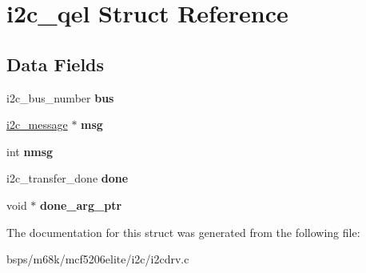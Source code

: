 \hypertarget{structi2c__qel}{}\section{i2c\+\_\+qel Struct Reference}
\label{structi2c__qel}
\subsection*{Data Fields}
\begin{DoxyCompactItemize}
\item 
\mbox{\label{structi2c__qel_a3d07d193200cafd5cd8cd2ca87120223}} 
i2c\+\_\+bus\+\_\+number {\bfseries bus}
\item 
\mbox{\label{structi2c__qel_a0605c7045d13c17bbc4be194a8cb1963}} 
\mbox{\hyperlink{structi2c__message}{i2c\+\_\+message}} $\ast$ {\bfseries msg}
\item 
\mbox{\label{structi2c__qel_a0857e9b319b26037cb6b81d573378360}} 
int {\bfseries nmsg}
\item 
\mbox{\label{structi2c__qel_a2d8294f7da9c484ff9b272d29dfcfb4c}} 
i2c\+\_\+transfer\+\_\+done {\bfseries done}
\item 
\mbox{\label{structi2c__qel_a1595937c493e31453db15176b99f3882}} 
void $\ast$ {\bfseries done\+\_\+arg\+\_\+ptr}
\end{DoxyCompactItemize}


The documentation for this struct was generated from the following file\+:\begin{DoxyCompactItemize}
\item 
bsps/m68k/mcf5206elite/i2c/i2cdrv.\+c\end{DoxyCompactItemize}

